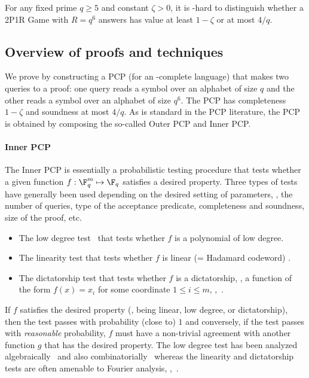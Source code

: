 \begin{theorem} \label{thm:main} For any fixed
prime $q \geq 5$ and constant $\zeta > 0$,
it is -hard to distinguish whether a 2P1R Game
with $R = q^6$ answers has value at least $1-\zeta$ or at most ${4}/{q}$.
\end{theorem}

\subsection{Overview of proofs and techniques}

We prove  by constructing a PCP (for an -complete language)
that makes two queries to a proof: one query reads a symbol over an alphabet of
size $q$ and the other reads a symbol
over an alphabet of size $q^6$. The PCP has completeness $1-\zeta$
and soundness at most ${4}/{q}$.
As is standard in the PCP literature, the PCP is obtained by composing the so-called
Outer PCP and Inner PCP.

\paragraph{Inner PCP}
The Inner PCP is essentially a probabilistic
testing procedure that tests whether a given function $f: \F_q^m \mapsto \F_q$
satisfies a desired property. Three types of tests have generally been used depending
on the desired setting of parameters, \eg, the number of queries, type of the
acceptance predicate,
completeness and soundness, size of the proof, etc.
\begin{itemize}
\item The low degree test~\cite{FGLSS, AS, AroraSudan, RazSafra} that tests whether $f$ is a polynomial of low degree.
\item The linearity test that tests whether $f$ is linear (= Hadamard codeword) \cite{ALMSS, Kh-maxclique}.
\item The dictatorship test that tests whether $f$ is a dictatorship, \ie, a function
of the form $f(x)=x_i$ for some coordinate $1 \leq i \leq m$, \eg,~\cite{BGS, Has96, Has97}.
\end{itemize}
If $f$ satisfies the desired property (\ie, being linear, low degree, or dictatorship),
then the test passes with probability
(close to) $1$ and conversely, if the test passes with \emph{reasonable} probability,
$f$ must have a non-trivial agreement with another function $g$ that has the desired property.
The low degree test has been analyzed algebraically~\cite{FGLSS, AS, AroraSudan}
and also combinatorially~\cite{RazSafra}
whereas the linearity and dictatorship tests are often amenable to
Fourier analysis, \eg,~\cite{Kh-maxclique, Has96, Has97, KKMO}.

